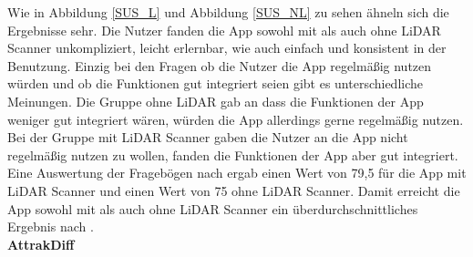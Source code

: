 \documentclass[12pt,a4paper]{article}
\begin{document}
Wie in Abbildung \ref{SUS_L} und Abbildung \ref{SUS_NL} zu sehen ähneln sich die Ergebnisse sehr. Die Nutzer fanden die App sowohl mit als auch ohne LiDAR Scanner unkompliziert, leicht erlernbar, wie auch einfach und konsistent in der Benutzung. Einzig bei den Fragen ob die Nutzer die App regelmäßig nutzen würden und ob die Funktionen gut integriert seien gibt es unterschiedliche Meinungen. Die Gruppe ohne LiDAR gab an dass die Funktionen der App weniger gut integriert wären, würden die App allerdings gerne regelmäßig nutzen. Bei der Gruppe mit LiDAR Scanner gaben die Nutzer an die App nicht regelmäßig nutzen zu wollen, fanden die Funktionen der App aber gut integriert.\\

Eine Auswertung der Fragebögen nach \cite{SUS_Score} ergab einen Wert von 79,5 für die App mit LiDAR Scanner und einen Wert von 75 ohne LiDAR Scanner. Damit erreicht die App sowohl mit als auch ohne LiDAR Scanner ein überdurchschnittliches Ergebnis nach \cite{SUS_Score}.\\

\textbf{AttrakDiff}\\
\end{document}
